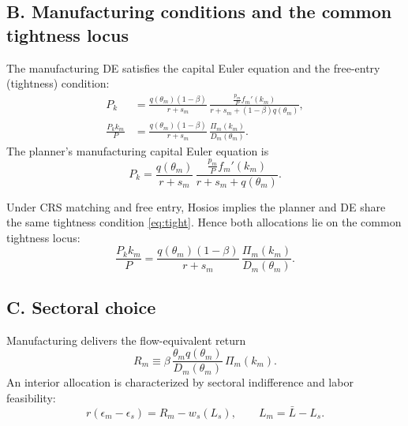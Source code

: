 \documentclass[12pt]{article}
\begin{document}

\subsection*{B. Manufacturing conditions and the common tightness locus}

The manufacturing DE satisfies the capital Euler equation and the free-entry (tightness) condition:
\begin{align}
P_k
&=
\frac{q(\theta_m)(1-\beta)}{r+s_m}\,
\frac{\frac{p_m}{P}f_m'(k_m)}{r+s_m+(1-\beta)q(\theta_m)},
\label{eq:DE_cap}\\
\frac{P_k k_m}{P}
&=
\frac{q(\theta_m)(1-\beta)}{r+s_m}\,
\frac{\Pi_m(k_m)}{D_m(\theta_m)}.
\label{eq:tight}
\end{align}
The planner's manufacturing capital Euler equation is
\begin{equation}\label{eq:SP_cap}
P_k
=
\frac{q(\theta_m)}{r+s_m}\,
\frac{\frac{p_m}{P}f_m'(k_m)}{r+s_m+q(\theta_m)}.
\end{equation}

Under CRS matching and free entry, Hosios implies the planner and DE share the same tightness condition \eqref{eq:tight}. Hence both allocations lie on the common tightness locus:
\begin{equation}\label{eq:common_locus}
\frac{P_k k_m}{P}
=
\frac{q(\theta_m)(1-\beta)}{r+s_m}\,
\frac{\Pi_m(k_m)}{D_m(\theta_m)}.
\end{equation}


\subsection*{C. Sectoral choice}

Manufacturing delivers the flow-equivalent return
\begin{equation}\label{eq:Rm}
R_m \equiv \beta\,\frac{\theta_m q(\theta_m)}{D_m(\theta_m)}\,\Pi_m(k_m).
\end{equation}
An interior allocation is characterized by sectoral indifference and labor feasibility:
\begin{equation}\label{eq:choice}
r(\epsilon_m-\epsilon_s)=R_m-w_s(L_s),\qquad L_m=\bar L-L_s.
\end{equation}
\end{document}
